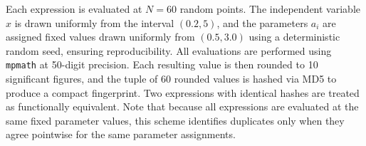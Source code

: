 \documentclass[preprint,12pt,authoryear]{elsarticle}
\newcommand{\hd}[1]{{\color{red}\textbf{[HD: #1]}}}
\begin{document}
Each expression is evaluated at $N = 60$ random points. The independent variable $x$ is drawn uniformly from the interval $(0.2, 5)$, %
and the parameters $a_i$ are assigned fixed values drawn uniformly from $(0.5, 3.0)$ using a deterministic random seed, ensuring reproducibility. All evaluations are performed using \texttt{mpmath} \citep{Meurer2017} at 50-digit precision. Each resulting value is then rounded to 10 significant figures, and the tuple of 60 rounded values is hashed via MD5 to produce a compact fingerprint. Two expressions with identical hashes are treated as functionally equivalent. Note that because all expressions are evaluated at the same fixed parameter values, this scheme identifies duplicates only when they agree pointwise for the same parameter assignments. %
\end{document}
